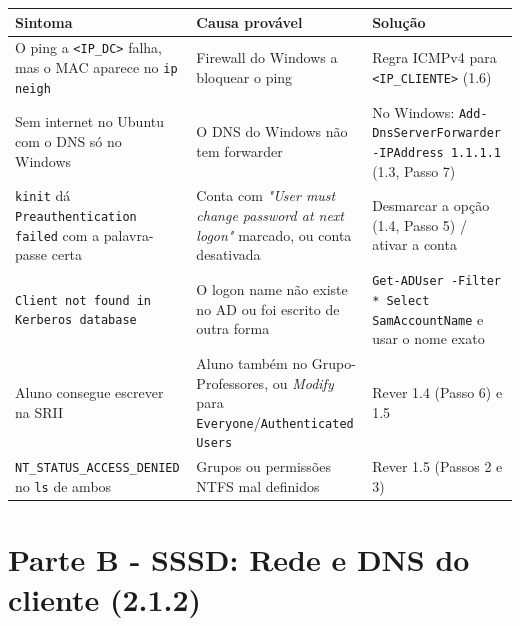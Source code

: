 \begin{center}\small
\begin{tabularx}{\linewidth}{|>{\raggedright\arraybackslash}X|>{\raggedright\arraybackslash}X|>{\raggedright\arraybackslash}X|}
\hline
\rowcolor{azul!10}\textbf{Sintoma} & \textbf{Causa provável} & \textbf{Solução} \\
\hline
O ping a \texttt{\textless{}IP\_DC\textgreater{}} falha, mas o MAC aparece no \texttt{ip neigh} & Firewall do Windows a bloquear o ping & Regra ICMPv4 para \texttt{\textless{}IP\_CLIENTE\textgreater{}} (1.6) \\
\hline
Sem internet no Ubuntu com o DNS só no Windows & O DNS do Windows não tem forwarder & No Windows: \texttt{Add-DnsServerForwarder -IPAddress 1.1.1.1} (1.3, Passo 7) \\
\hline
\texttt{kinit} dá \texttt{Preauthentication failed} com a palavra-passe certa & Conta com \emph{"User must change password at next logon"} marcado, ou conta desativada & Desmarcar a opção (1.4, Passo 5) / ativar a conta \\
\hline
\texttt{Client not found in Kerberos database} & O logon name não existe no AD ou foi escrito de outra forma & \texttt{Get-ADUser -Filter * \textbar{} Select SamAccountName} e usar o nome exato \\
\hline
Aluno consegue escrever na SRII & Aluno também no Grupo-Professores, ou \emph{Modify} para \texttt{Everyone}/\texttt{Authenticated Users} & Rever 1.4 (Passo 6) e 1.5 \\
\hline
\texttt{NT\_STATUS\_ACCESS\_DENIED} no \texttt{ls} de ambos & Grupos ou permissões NTFS mal definidos & Rever 1.5 (Passos 2 e 3) \\
\hline
\end{tabularx}
\end{center}

\label{ec-b1-rede}

\section*{Parte B - SSSD: Rede e DNS do cliente (2.1.2)}


